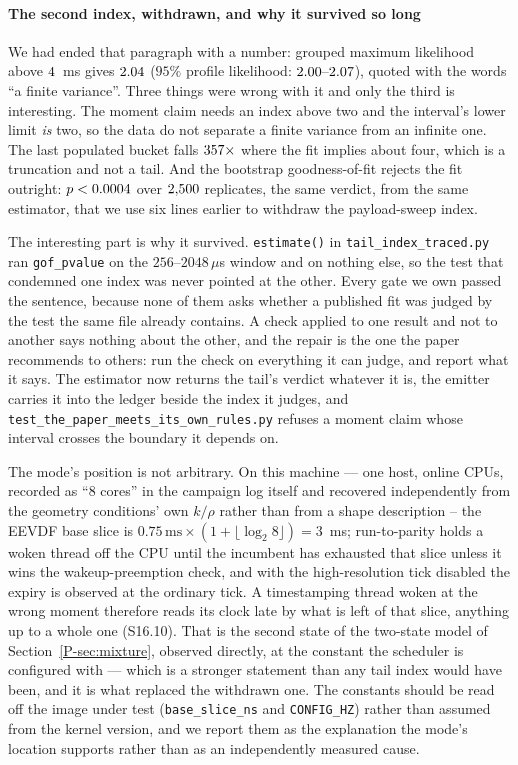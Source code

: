 \documentclass[10pt,journal,onecolumn]{IEEEtran}
\newcommand{\mainRareState}{\ref{P-sec:mixture}}       %
\begin{document}
\paragraph{The second index, withdrawn, and why it survived so long}
We had ended that paragraph with a number: grouped maximum likelihood above
$4$~ms gives $2.04$ ($95\%$ profile likelihood: $\tracedTailCI$), quoted with the words ``a
finite variance''. Three things were wrong with it and only the third is interesting. The
moment claim needs an index above two and the interval's lower limit \emph{is} two, so the
data do not separate a finite variance from an infinite one. The last populated bucket falls
$357\times$ where the fit implies about four, which is a truncation and not a
tail. And the bootstrap goodness-of-fit rejects the fit outright: $p <0.0004$ over
$2{,}500$ replicates, the same verdict, from the same estimator, that we use six
lines earlier to withdraw the payload-sweep index.

The interesting part is why it survived. \texttt{estimate()} in
\texttt{tail\_index\_traced.py} ran \texttt{gof\_pvalue} on the $256$--$2048\,\mu$s window
and on nothing else, so the test that condemned one index was never pointed at the other.
Every gate we own passed the sentence, because none of them asks whether a published fit was
judged by the test the same file already contains. A check applied to one result and not to
another says nothing about the other, and the repair is the one the paper recommends to
others: run the check on everything it can judge, and report what it says. The estimator now returns the tail's
verdict whatever it is, the emitter carries it into the ledger beside the index it judges,
and \texttt{test\_the\_paper\_meets\_its\_own\_rules.py} refuses a moment claim whose interval
crosses the boundary it depends on.

The mode's position is not arbitrary. On this machine --- one host, \testbedCpus{} online
CPUs, recorded as ``8 cores'' in the campaign log itself and recovered independently from
the geometry
conditions' own $k/\rho$ rather than from a shape description -- the EEVDF base slice is
$0.75\,\mathrm{ms} \times (1 + \lfloor\log_2 8\rfloor) = 3$~ms; run-to-parity holds a woken
thread off the CPU until the incumbent has exhausted that slice unless it wins the
wakeup-preemption check, and with the high-resolution tick disabled the expiry is observed
at the ordinary tick. A timestamping thread woken at the wrong moment therefore reads its clock
late by what is left of that slice, anything up to a whole one (S16.10). That is the second state of the two-state model of Section~\mainRareState{},
observed directly, at the constant the scheduler is configured with --- which is a stronger
statement than any tail index would have been, and it is what replaced the withdrawn one.
The constants should be read off the image under test (\texttt{base\_slice\_ns} and
\texttt{CONFIG\_HZ}) rather than assumed from the kernel version, and we report them as the
explanation the mode's location supports rather than as an independently measured cause.
\end{document}
